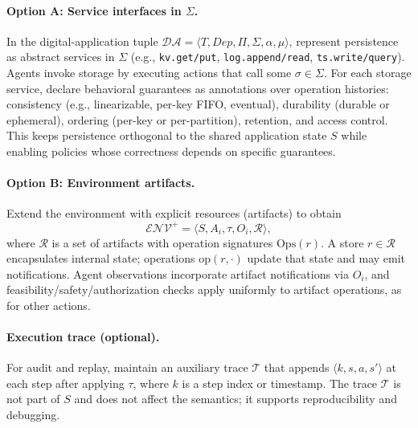 \paragraph{Option A: Service interfaces in $\Sigma$.} In the digital-application tuple $\mathcal{DA}=\langle T, Dep, \Pi, \Sigma, \alpha, \mu \rangle$, represent persistence as abstract services in $\Sigma$ (e.g., \texttt{kv.get/put}, \texttt{log.append/read}, \texttt{ts.write/query}). Agents invoke storage by executing actions that call some $\sigma\in\Sigma$. For each storage service, declare behavioral guarantees as annotations over operation histories: consistency (e.g., linearizable, per-key FIFO, eventual), durability (durable or ephemeral), ordering (per-key or per-partition), retention, and access control. This keeps persistence orthogonal to the shared application state $S$ while enabling policies whose correctness depends on specific guarantees.

\paragraph{Option B: Environment artifacts.} Extend the environment with explicit resources (artifacts) to obtain
\[
\mathcal{ENV}^{+} = \langle S, A_i, \tau, O_i, \mathcal{R} \rangle,
\]
where $\mathcal{R}$ is a set of artifacts with operation signatures $\mathrm{Ops}(r)$. A store $r\in\mathcal{R}$ encapsulates internal state; operations $\mathrm{op}(r,\cdot)$ update that state and may emit notifications. Agent observations incorporate artifact notifications via $O_i$, and feasibility/safety/authorization checks apply uniformly to artifact operations, as for other actions.

\paragraph{Execution trace (optional).} For audit and replay, maintain an auxiliary trace $\mathcal{T}$ that appends $\langle k, s, a, s' \rangle$ at each step after applying $\tau$, where $k$ is a step index or timestamp. The trace $\mathcal{T}$ is not part of $S$ and does not affect the semantics; it supports reproducibility and debugging.
